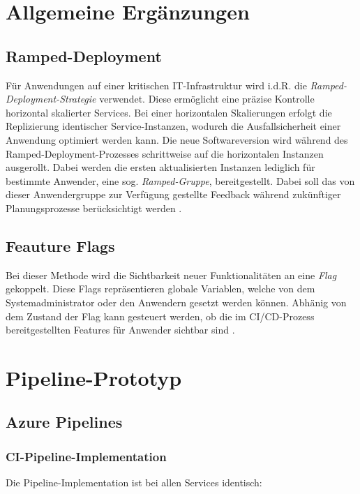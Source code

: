 \section{Allgemeine Ergänzungen}


\subsection{Ramped-Deployment}
Für Anwendungen auf einer kritischen IT-Infrastruktur wird i.d.R. die \textit{Ramped-Deployment-Strategie} verwendet. Diese ermöglicht eine präzise Kontrolle horizontal skalierter Services. Bei einer horizontalen Skalierungen erfolgt die Replizierung identischer Service-Instanzen, wodurch die Ausfallsicherheit einer Anwendung optimiert werden kann. Die neue Softwareversion wird während des Ramped-Deployment-Prozesses schrittweise auf die horizontalen Instanzen ausgerollt. Dabei werden die ersten aktualisierten Instanzen lediglich für bestimmte Anwender, eine sog. \textit{Ramped-Gruppe}, bereitgestellt. Dabei soll das von dieser Anwendergruppe zur Verfügung gestellte Feedback während zukünftiger Planungsprozesse berücksichtigt werden \cite{Ugochi.20220503}.


\subsection{Feauture Flags}
Bei dieser Methode wird die Sichtbarkeit neuer Funktionalitäten an eine \textit{Flag} gekoppelt. Diese Flags repräsentieren globale Variablen, welche von dem Systemadministrator oder den Anwendern gesetzt werden können. Abhänig von dem Zustand der Flag kann gesteuert werden, ob die im CI/CD-Prozess bereitgestellten Features für Anwender sichtbar sind \cite{Atlassian.20230409}.

\newpage
\section{Pipeline-Prototyp}
\subsection{Azure Pipelines}
\subsubsection{CI-Pipeline-Implementation}
Die Pipeline-Implementation ist bei allen Services identisch:\\

